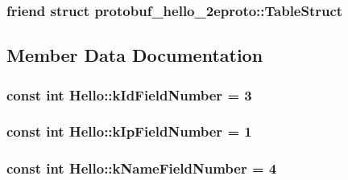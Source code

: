 \subsubsection[{\texorpdfstring{protobuf\+\_\+hello\+\_\+2eproto\+::\+Table\+Struct}{protobuf_hello_2eproto::TableStruct}}]{\setlength{\rightskip}{0pt plus 5cm}friend struct {\bf protobuf\+\_\+hello\+\_\+2eproto\+::\+Table\+Struct}\hspace{0.3cm}{\ttfamily [friend]}}\hypertarget{class_hello_afeaee1d7886002cf42ab7a090afb0a1c}{}\label{class_hello_afeaee1d7886002cf42ab7a090afb0a1c}


\subsection{Member Data Documentation}
\subsubsection[{\texorpdfstring{k\+Id\+Field\+Number}{kIdFieldNumber}}]{\setlength{\rightskip}{0pt plus 5cm}const int Hello\+::k\+Id\+Field\+Number = 3\hspace{0.3cm}{\ttfamily [static]}}\hypertarget{class_hello_a0037e73934ee5284e2cdc7ed3ee08240}{}\label{class_hello_a0037e73934ee5284e2cdc7ed3ee08240}
\subsubsection[{\texorpdfstring{k\+Ip\+Field\+Number}{kIpFieldNumber}}]{\setlength{\rightskip}{0pt plus 5cm}const int Hello\+::k\+Ip\+Field\+Number = 1\hspace{0.3cm}{\ttfamily [static]}}\hypertarget{class_hello_aaab2e3961762dda3d0bba74ef3024054}{}\label{class_hello_aaab2e3961762dda3d0bba74ef3024054}
\subsubsection[{\texorpdfstring{k\+Name\+Field\+Number}{kNameFieldNumber}}]{\setlength{\rightskip}{0pt plus 5cm}const int Hello\+::k\+Name\+Field\+Number = 4\hspace{0.3cm}{\ttfamily [static]}}\hypertarget{class_hello_ac858de891973af41de85d53ad9fc02a7}{}\label{class_hello_ac858de891973af41de85d53ad9fc02a7}
